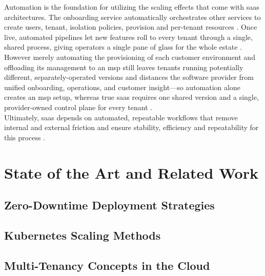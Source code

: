 \documentclass[11pt, a4paper, oneside, listof=totoc]{scrartcl}
\begin{document}
            Automation is the foundation for utilizing the scaling effects that come with \gls{saas}
            architectures. The onboarding service automatically orchestrates other services to
            create users, tenant, isolation policies, provision and per-tenant resources
            \parencite[p.~14]{awsSaaSArchitectureFundamentals}.
            Once live, automated pipelines let new features roll to every tenant through a single,
            shared process, giving operators a single pane of glass for the whole estate
            \parencite[p.~10]{awsSaaSArchitectureFundamentals}.
            However merely automating the provisioning of each customer environment and offloading
            its management to an \gls{msp} still leaves tenants running potentially different,
            separately-operated versions and distances the software provider from unified
            onboarding, operations, and customer insight—so automation alone creates an \gls{msp}
            setup, whereas true \gls{saas} requires one shared version and a single, provider-owned
            control plane for every tenant \parencite[pp.~23--24]{awsSaaSArchitectureFundamentals}.
            \\
            Ultimately, \gls{saas} depends on automated, repeatable workflows that remove internal
            and external friction and ensure stability, efficiency and repeatability for this
            process \parencite[p.~14]{awsSaaSArchitectureFundamentals}.

    \section{State of the Art and Related Work}\label{sec:related}

        \subsection{Zero-Downtime Deployment Strategies}\label{subsec:zeroDowntime}

        \subsection{Kubernetes Scaling Methods}\label{subsec:k8sScaling}

        \subsection{Multi-Tenancy Concepts in the Cloud}\label{subsec:mtConcepts}
\end{document}

